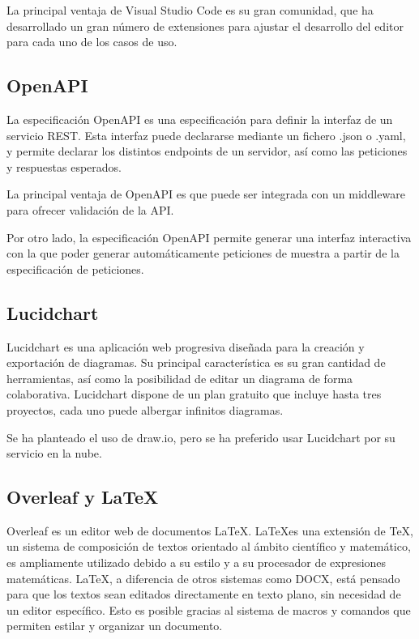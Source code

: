 La principal ventaja de Visual Studio Code es su gran comunidad, que ha
desarrollado un gran número de extensiones para ajustar el desarrollo
del editor para cada uno de los casos de uso.

\hypertarget{openapi}{%
\subsection{OpenAPI}\label{openapi}}

La especificación OpenAPI es una especificación para definir la interfaz
de un servicio REST. Esta interfaz puede declararse mediante un fichero .json o .yaml, y permite declarar los distintos endpoints de un servidor,
así como las peticiones y respuestas esperados.

La principal ventaja de OpenAPI es que puede ser integrada con un
middleware para ofrecer validación de la API.

Por otro lado, la especificación OpenAPI permite generar una interfaz
interactiva con la que poder generar automáticamente peticiones de
muestra a partir de la especificación de peticiones.

\subsection{Lucidchart}
Lucidchart es una aplicación web progresiva diseñada para la creación y exportación de diagramas. Su principal característica es su gran cantidad de herramientas, así como la posibilidad de editar un diagrama de forma colaborativa.
Lucidchart dispone de un plan gratuito que incluye hasta tres proyectos, cada uno puede albergar infinitos diagramas.

Se ha planteado el uso de draw.io, pero se ha preferido usar Lucidchart por su servicio en la nube. 


\subsection{Overleaf y \LaTeX}
Overleaf es un editor web de documentos \LaTeX. \LaTeX es una extensión de \TeX, un sistema de composición de textos orientado al ámbito científico y matemático, es ampliamente utilizado debido a su estilo y a su procesador de expresiones matemáticas. \LaTeX, a diferencia de otros sistemas como DOCX, está pensado para que los textos sean editados directamente en texto plano, sin necesidad de un editor específico. Esto es posible gracias al sistema de macros y comandos que permiten estilar y organizar un documento. 

